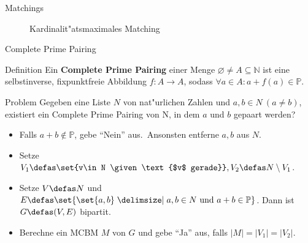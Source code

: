 \begin{frame}{Matchings}

\begin{figure}
\pause\caption*{\large Kardinalit"atsmaximales Matching}
\end{figure}
\end{frame}

\begin{frame}{Complete Prime Pairing}
\begin{block}{Definition}\pause
Ein \textbf{Complete Prime Pairing} einer Menge \(\varnothing \neq A \subseteq \mathbb{N}\) ist eine selbstinverse, fixpunktfreie Abbildung \(f\colon A \to A\), sodass \(\forall a \in A: a + f(a) \in \mathbb{P}\).
\end{block}

\pause\begin{block}{Problem}
Gegeben eine Liste \(N\) von nat"urlichen Zahlen und \(a, b \in N \ (a \neq b)\), existiert ein Complete Prime Pairing von N, in dem \(a\) und \(b\) gepaart werden?\\ \pause
\begin{itemize}
\item Falls \(a+b\notin \mathbb{P}\), gebe \enquote{Nein} aus.\pause\ Ansonsten entferne \(a, b\) aus \(N\).\pause
\item Setze \(V_1 \defas \set{v\in N \given \text{$v$ gerade}}, V_2 \defas N \setminus V_1\).\pause
\item Setze \(V \defas N\) und \(E \defas \set{\set{a,b}\given a,b\in N \text{ und } a+b\in \mathbb{P}}\). Dann ist \(G \defas (V, E)\) bipartit.\pause
\item Berechne ein MCBM \(M\) von \(G\) und gebe \enquote{Ja} aus, falls \(|M| = |V_1| = |V_2|\).
\end{itemize}
\end{block}
\end{frame}

